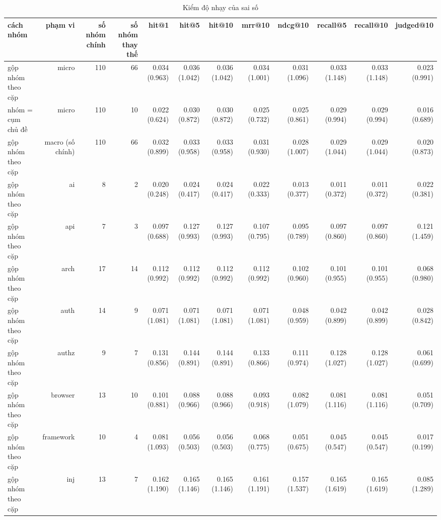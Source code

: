\begin{table}[ht]
\centering
\caption{Kiểm độ nhạy của sai số}
\begin{tabular}{lrrrrrrrrrrr}
\toprule
cách nhóm & phạm vi & số nhóm chính & số nhóm thay thế & hit@1 & hit@5 & hit@10 & mrr@10 & ndcg@10 & recall@5 & recall@10 & judged@10 \\
\midrule
gộp nhóm theo cặp & micro & 110 & 66 & 0.034 (0.963) & 0.036 (1.042) & 0.036 (1.042) & 0.034 (1.001) & 0.031 (1.096) & 0.033 (1.148) & 0.033 (1.148) & 0.023 (0.991) \\
nhóm = cụm chủ đề & micro & 110 & 10 & 0.022 (0.624) & 0.030 (0.872) & 0.030 (0.872) & 0.025 (0.732) & 0.025 (0.861) & 0.029 (0.994) & 0.029 (0.994) & 0.016 (0.689) \\
gộp nhóm theo cặp & macro (số chính) & 110 & 66 & 0.032 (0.899) & 0.033 (0.958) & 0.033 (0.958) & 0.031 (0.930) & 0.028 (1.007) & 0.029 (1.044) & 0.029 (1.044) & 0.020 (0.873) \\
gộp nhóm theo cặp & ai & 8 & 2 & 0.020 (0.248) & 0.024 (0.417) & 0.024 (0.417) & 0.022 (0.333) & 0.013 (0.377) & 0.011 (0.372) & 0.011 (0.372) & 0.022 (0.381) \\
gộp nhóm theo cặp & api & 7 & 3 & 0.097 (0.688) & 0.127 (0.993) & 0.127 (0.993) & 0.107 (0.795) & 0.095 (0.789) & 0.097 (0.860) & 0.097 (0.860) & 0.121 (1.459) \\
gộp nhóm theo cặp & arch & 17 & 14 & 0.112 (0.992) & 0.112 (0.992) & 0.112 (0.992) & 0.112 (0.992) & 0.102 (0.960) & 0.101 (0.955) & 0.101 (0.955) & 0.068 (0.980) \\
gộp nhóm theo cặp & auth & 14 & 9 & 0.071 (1.081) & 0.071 (1.081) & 0.071 (1.081) & 0.071 (1.081) & 0.048 (0.959) & 0.042 (0.899) & 0.042 (0.899) & 0.028 (0.842) \\
gộp nhóm theo cặp & authz & 9 & 7 & 0.131 (0.856) & 0.144 (0.891) & 0.144 (0.891) & 0.133 (0.866) & 0.111 (0.974) & 0.128 (1.027) & 0.128 (1.027) & 0.061 (0.699) \\
gộp nhóm theo cặp & browser & 13 & 10 & 0.101 (0.881) & 0.088 (0.966) & 0.088 (0.966) & 0.093 (0.918) & 0.082 (1.079) & 0.081 (1.116) & 0.081 (1.116) & 0.051 (0.709) \\
gộp nhóm theo cặp & framework & 10 & 4 & 0.081 (1.093) & 0.056 (0.503) & 0.056 (0.503) & 0.068 (0.775) & 0.051 (0.675) & 0.045 (0.547) & 0.045 (0.547) & 0.017 (0.199) \\
gộp nhóm theo cặp & inj & 13 & 7 & 0.162 (1.190) & 0.165 (1.146) & 0.165 (1.146) & 0.161 (1.191) & 0.157 (1.537) & 0.165 (1.619) & 0.165 (1.619) & 0.085 (1.289) \\

\end{tabular}
\end{table}
